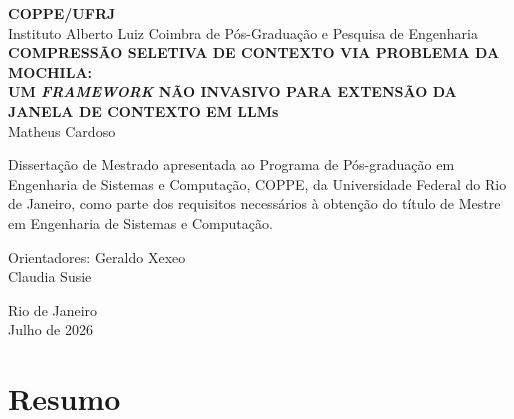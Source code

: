 \documentclass[12pt,a4paper,oneside]{report}
\begin{document}
\begin{titlepage}
\begin{center}
\textbf{\large COPPE/UFRJ}\\[0.3cm]
{\small Instituto Alberto Luiz Coimbra de Pós-Graduação e Pesquisa de Engenharia}\\[2.5cm]

{\Large\bfseries COMPRESSÃO SELETIVA DE CONTEXTO VIA PROBLEMA DA MOCHILA:\\[0.4cm]
UM \textit{FRAMEWORK} NÃO INVASIVO PARA EXTENSÃO DA JANELA DE CONTEXTO EM LLMs}\\[3cm]

{\large Matheus Cardoso}\\[3cm]

\begin{flushright}
\begin{minipage}{0.55\textwidth}
Dissertação de Mestrado apresentada ao Programa de
Pós-graduação em Engenharia de Sistemas e Computação,
COPPE, da Universidade Federal do Rio de Janeiro, como
parte dos requisitos necessários à obtenção do título de
Mestre em Engenharia de Sistemas e Computação.
\end{minipage}
\end{flushright}

\vspace{1.5cm}
\begin{flushright}
\begin{minipage}{0.55\textwidth}
Orientadores: Geraldo Xexeo\\
\phantom{Orientadores: }Claudia Susie
\end{minipage}
\end{flushright}

\vfill
Rio de Janeiro\\
Julho de 2026
\end{center}
\end{titlepage}

\chapter*{Resumo}
\end{document}

